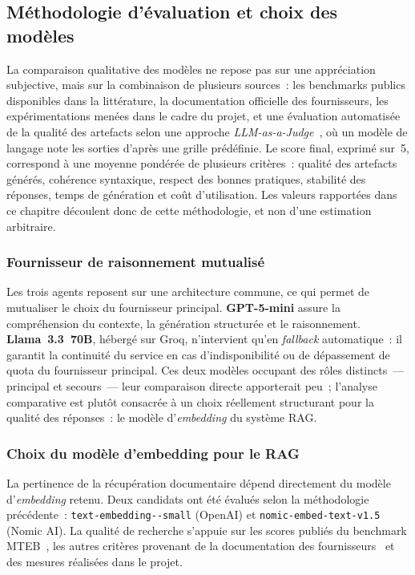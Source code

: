 \subsection{Méthodologie d'évaluation et choix des modèles}

La comparaison qualitative des modèles ne repose pas sur une appréciation subjective, mais
sur la combinaison de plusieurs sources~: les benchmarks publics disponibles dans la
littérature, la documentation officielle des fournisseurs, les expérimentations menées dans
le cadre du projet, et une évaluation automatisée de la qualité des artefacts selon une
approche \textit{LLM-as-a-Judge}~\cite{LLM_AS_JUDGE}, où un modèle de langage note les
sorties d'après une grille prédéfinie. Le score final, exprimé sur~5, correspond à une
moyenne pondérée de plusieurs critères~: qualité des artefacts générés, cohérence
syntaxique, respect des bonnes pratiques, stabilité des réponses, temps de génération et
coût d'utilisation. Les valeurs rapportées dans ce chapitre découlent donc de cette
méthodologie, et non d'une estimation arbitraire.

\subsubsection{Fournisseur de raisonnement mutualisé}

Les trois agents reposent sur une architecture commune, ce qui permet de mutualiser le
choix du fournisseur principal. \textbf{GPT-5-mini} assure la compréhension du contexte, la
génération structurée et le raisonnement. \textbf{Llama~3.3~70B}, hébergé sur Groq,
n'intervient qu'en \textit{fallback} automatique~: il garantit la continuité du service en
cas d'indisponibilité ou de dépassement de quota du fournisseur principal. Ces deux modèles
occupant des rôles distincts~--- principal et secours~--- leur comparaison directe
apporterait peu~; l'analyse comparative est plutôt consacrée à un choix réellement
structurant pour la qualité des réponses~: le modèle d'\textit{embedding} du système RAG.

\subsubsection{Choix du modèle d'embedding pour le RAG}

La pertinence de la récupération documentaire dépend directement du modèle d'\textit{embedding}
retenu. Deux candidats ont été évalués selon la méthodologie précédente~:
\texttt{text-embedding--small} (OpenAI) et \texttt{nomic-embed-\allowbreak text-v1.5} (Nomic AI). La
qualité de recherche s'appuie sur les scores publiés du benchmark MTEB~\cite{MTEB}, les
autres critères provenant de la documentation des fournisseurs~\cite{OPENAI_DOCS,NOMIC_EMBED}
et des mesures réalisées dans le projet.

